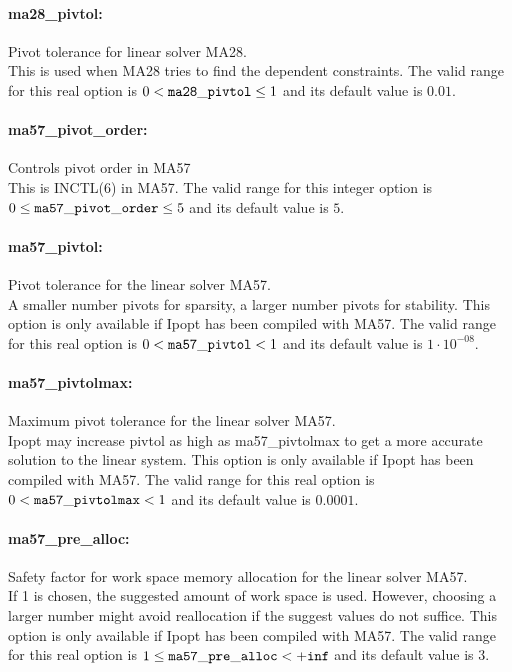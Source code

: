 \paragraph{ma28\_pivtol:}\label{sec:ma28_pivtol} Pivot tolerance for linear solver MA28. $\;$ \\
 This is used when MA28 tries to find the
dependent constraints. The valid range for this real option is 
$0 <  {\tt ma28\_pivtol } \le 1$
and its default value is $0.01$.


\paragraph{ma57\_pivot\_order:}\label{sec:ma57_pivot_order} Controls pivot order in MA57 $\;$ \\
 This is INCTL(6) in MA57. The valid range for this integer option is
$0 \le {\tt ma57\_pivot\_order } \le 5$
and its default value is $5$.


\paragraph{ma57\_pivtol:}\label{sec:ma57_pivtol} Pivot tolerance for the linear solver MA57. $\;$ \\
 A smaller number pivots for sparsity, a larger
number pivots for stability. This option is only
available if Ipopt has been compiled with MA57. The valid range for this real option is 
$0 <  {\tt ma57\_pivtol } <  1$
and its default value is $1 \cdot 10^{-08}$.


\paragraph{ma57\_pivtolmax:}\label{sec:ma57_pivtolmax} Maximum pivot tolerance for the linear solver MA57. $\;$ \\
 Ipopt may increase pivtol as high as
ma57\_pivtolmax to get a more accurate solution
to the linear system.  This option is only
available if Ipopt has been compiled with MA57. The valid range for this real option is 
$0 <  {\tt ma57\_pivtolmax } <  1$
and its default value is $0.0001$.


\paragraph{ma57\_pre\_alloc:}\label{sec:ma57_pre_alloc} Safety factor for work space memory allocation for the linear solver MA57. $\;$ \\
 If 1 is chosen, the suggested amount of work
space is used.  However, choosing a larger number
might avoid reallocation if the suggest values do
not suffice.  This option is only available if
Ipopt has been compiled with MA57. The valid range for this real option is 
$1 \le {\tt ma57\_pre\_alloc } <  {\tt +inf}$
and its default value is $3$.



